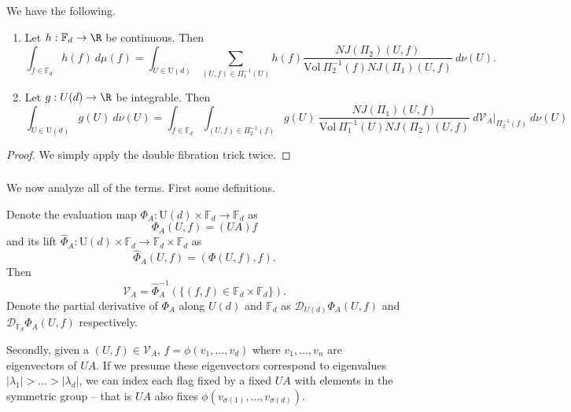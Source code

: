 \documentclass[10pt]{amsart}
\numberwithin{equation}{section}     %
\newcommand{\cD}{\mathcal{D}}\newcommand{\cE}{\mathcal{E}}\newcommand{\cF}{\mathcal{F}}
\newcommand{\cV}{\mathcal{V}}\newcommand{\cW}{\mathcal{W}}\newcommand{\cX}{\mathcal{X}}
\newcommand{\FF}{\mathbb{F}}
\newcommand{\U}{\mathrm{U}}
\begin{document}

\begin{proposition} We have the following.

\begin{enumerate}
    \item Let $h:\FF_d \to \R$ be continuous. Then
    \begin{equation*}
        \int_{f \in \FF_d} h(f) \ d\mu(f) = \int_{U \in \U(d)} \sum_{(U,f) \in \Pi_1^{-1}(U)} h(f) \frac{NJ(\Pi_2)(U,f)}{\mathrm{Vol}\  \Pi^{-1}_2(f) NJ(\Pi_1)(U,f)} \ d\nu(U).
    \end{equation*}

    \item Let $g: U(d) \to \R$ be integrable. Then 
        \begin{equation*}
            \int_{U \in \U(d)} g(U) \ d\nu(U) =
        \int_{f \in \FF_d} \int_{(U,f) \in \Pi_2^{-1}(f)} g(U) \ \frac{NJ(\Pi_1)(U,f)}{\mathrm{Vol} \ \Pi_1^{-1}(U) NJ(\Pi_2)(U,f)} \ d\cV_A|_{\Pi_2^{-1}(f)} \ d\nu(U)
        \end{equation*}
\end{enumerate}
\end{proposition}

\begin{proof}
    We simply apply the double fibration trick twice. 
\end{proof}

\subsubsection{}

We now analyze all of the terms. First some definitions. 

Denote the evaluation map $\Phi_A:\U(d) \times \FF_d \to \FF_d$ as $$\Phi_A(U,f) = (UA)f$$ and its lift $\hat{\Phi}_A:\U(d) \times \FF_d \to \FF_d \times \FF_d$ as $$\hat{\Phi}_A(U,f) = (\Phi(U,f),f).$$ Then $$\cV_A = \hat{\Phi}^{-1}_A(\{(f,f) \in \FF_d \times \FF_d\}).$$ Denote the partial derivative of $\Phi_A$ along $U(d)$ and $\FF_d$ as $\cD_{U(d)} \Phi_A(U,f)$ and  $\cD_{\FF_d} \Phi_A(U,f)$ respectively. 

Secondly, given a $(U,f) \in \cV_A$, $f = \phi(v_1,...,v_d)$ where $v_1,...,v_n$ are eigenvectors of $UA$. If we presume these eigenvectors correspond to eigenvalues $|\lambda_1| > ... > |\lambda_d|$, we can index each flag fixed by a fixed $UA$ with elements in the symmetric group -- that is $UA$ also fixes $\phi(v_{\sigma(1)},...,v_{\sigma(d)})$. 
\end{document}
